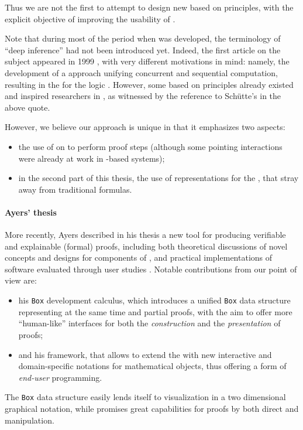 Thus we are not the first to attempt to design new  based on  principles, with the explicit objective of improving the usability of
.
\begin{digression}
  \AP
  Note that during most of the period when  was developed,
the terminology of ``deep inference'' had not been introduced yet. Indeed, the
first article on the subject appeared in 1999 \cite{Guglielmi1999ACO}, with very
different motivations in mind: namely, the development of a
 approach unifying concurrent and sequential computation,
resulting in the  for the logic . However,
some  based on  principles already existed
and inspired researchers in , as witnessed by the reference
to Schütte's  in the above quote.
\end{digression}
However, we believe our approach is unique in that it emphasizes two aspects:
\begin{itemize}
  \item the use of \emph{} on  to perform
  proof steps (although some pointing interactions were already at work in
  -based systems);
  \item in the second part of this thesis, the use of \emph{}
  representations for the , that stray away from traditional
   formulas.
\end{itemize}

\paragraph{Ayers' thesis}

More recently, Ayers described in his thesis a new tool for producing verifiable
and explainable (formal) proofs, including both theoretical discussions of novel
concepts and designs for components of , and practical
implementations of software evaluated through user studies
. Notable contributions from our point of view are:
\begin{itemize}
  \item his \texttt{Box} development calculus, which introduces a unified
\texttt{Box} data structure representing at the same time  and partial
proofs, with the aim to offer more ``human-like'' interfaces for both the
\emph{construction} and the \emph{presentation} of proofs;
  \item and his  framework, that allows to extend the
  with new interactive and domain-specific
notations for mathematical objects, thus offering a form of \emph{end-user}
programming.
\end{itemize}
The \texttt{Box} data structure easily lends itself to visualization in a two
dimensional graphical notation, while  promises great
capabilities for proofs by both direct and  manipulation.

